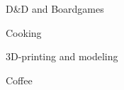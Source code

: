 \begin{zitemize}
\item D\&D and Boardgames
\item Cooking
\item 3D-printing and modeling
\item Coffee
\end{zitemize}